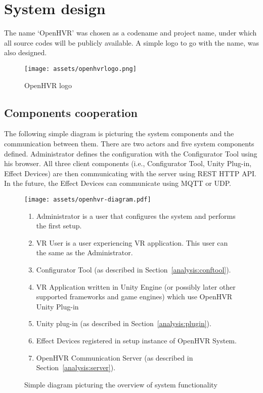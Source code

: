 \chapter{System design}\label{design}

The name `OpenHVR' was chosen as a codename and project name, under which
all source codes will be publicly available. A simple logo to
go with the name, was also designed.

\begin{figure}[h]{}
\centering\texttt{[image: assets/openhvrlogo.png]}
\caption{OpenHVR logo}
\end{figure}

\hypertarget{x-components-cooperation}{\section{Components cooperation}}
The following simple diagram is picturing the system components and the
communication between them. There are two actors and five system
components defined. Administrator defines the configuration with the
Configurator Tool using his browser. All three client components
(i.e., Configurator Tool, Unity Plug-in, Effect Devices) are then communicating
with the server using REST HTTP API. In the future, the Effect Devices
can communicate using MQTT or UDP.


\begin{figure}[h]{}
\centering\texttt{[image: assets/openhvr-diagram.pdf]}
\caption{Simple diagram picturing the overview of system functionality}
\begin{enumerate}
    \item Administrator is a user that configures the system and performs the first setup.
    \item VR User is a user experiencing VR application. This user can the same as the Administrator.
    \item Configurator Tool (as described in Section~\ref{analysis:conftool}).
    \item VR Application written in Unity Engine (or possibly later other supported frameworks and game engines) which use OpenHVR Unity Plug-in
    \item Unity plug-in (as described in Section~\ref{analysis:plugin}).
    \item Effect Devices registered in setup instance of OpenHVR System.
    \item OpenHVR Communication Server (as described in Section~\ref{analysis:server}).
\end{enumerate}
\end{figure}



